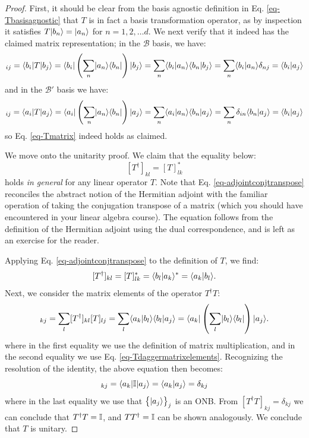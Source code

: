\begin{proof}
    First, it should be clear from the basis agnostic definition in Eq. \eqref{eq-Tbasisagnostic} that $T$ is in fact a basis transformation operator, as by inspection it satisfies $T\lvert b_n \rangle = \lvert a_n \rangle$ for $n = 1, 2, \ldots d$. We next verify that it indeed has the claimed matrix representation; in the $\mathcal{B}$ basis, we have:
    \begin{equation}
        [T]_{ij} = \bra{b_i}T\ket{b_j} = \bra{b_i}\left(\sum_n \dyad{a_n}{b_n}\right)\ket{b_j} = \sum_n \braket{b_i}{a_n}\braket{b_n}{b_j} = \sum_n \braket{b_i}{a_n} \delta_{nj} = \braket{b_i}{a_j}
    \end{equation}
    and in the $\mathcal{B}'$ basis we have:
    \begin{equation}
        [T]_{ij} = \bra{a_i}T\ket{a_j} =  \bra{a_i}\left(\sum_n \dyad{a_n}{b_n}\right)\ket{a_j} = \sum_n \braket{a_i}{a_n}\braket{b_n}{a_j} = \sum_n \delta_{in}\braket{b_n}{a_j} = \braket{b_i}{a_j}
    \end{equation}
    so Eq. \eqref{eq-Tmatrix} indeed holds as claimed.
    
    We move onto the unitarity proof. We claim that the equality below:
    \begin{equation}\label{eq-adjointconjtranspose}
        [T^\dagger]_{kl} = [T]_{lk}^*
    \end{equation}
    holds \emph{in general} for any linear operator $T$. Note that Eq. \eqref{eq-adjointconjtranspose} reconciles the abstract notion of the Hermitian adjoint with the familiar operation of taking the conjugation transpose of a matrix (which you should have encountered in your linear algebra course). The equation follows from the definition of the Hermitian adjoint using the dual correspondence, and is left as an exercise for the reader. 

    Applying Eq. \eqref{eq-adjointconjtranspose} to the definition of $T$, we find:
    \begin{equation}\label{eq-Tdaggermatrixelements}
        [T^\dagger]_{kl} = [T]_{lk}^* = \langle b_l \lvert a_k \rangle^* = \langle a_k \lvert b_l \rangle.
    \end{equation}
    Next, we consider the matrix elements of the operator $T^\dagger T$:
    \begin{equation}
        [T^\dagger T]_{kj} = \sum_l [T^\dagger]_{kl}[T]_{lj} = \sum_l \braket{a_k}{b_l} \braket{b_l}{a_j} = \bra{a_k}\left(\sum_l \dyad{b_l}{b_l}\right)\ket{a_j}.
    \end{equation}
    where in the first equality we use the definition of matrix multiplication, and in the second equality we use Eq. \eqref{eq-Tdaggermatrixelements}. Recognizing the resolution of the identity, the above equation then becomes:
    \begin{equation}
        [T^\dagger T]_{kj} = \bra{a_k}\II\ket{a_j} = \braket{a_k}{a_j} = \delta_{kj}
    \end{equation}
    where in the last equality we use that $\set{\lvert a_j \rangle}_j$ is an ONB. From $[T^\dagger T]_{kj} = \delta_{kj}$ we can conclude that  $T^\dagger T = \mathbb{I}$, and $TT^\dagger = \mathbb{I}$ can be shown analogously. We conclude that $T$ is unitary.
\end{proof}

